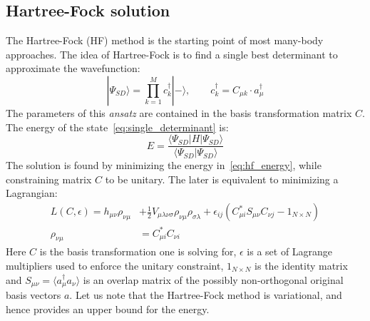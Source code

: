 \subsection{Hartree-Fock solution}
The Hartree-Fock (HF) method is the starting point of most many-body approaches.
The idea of Hartree-Fock is to find a single best determinant to 
approximate the wavefunction:
%
\begin{equation}
 |\Psi_{SD} \rangle = \prod_{k=1}^{M} c_k^{\dagger} | -\rangle, \qquad 
c_{k}^{\dagger} = C_{\mu k} \cdot a^{\dagger}_{\mu}
\label{eq:single_determinant}
\end{equation}
% 
The parameters of this \emph{ansatz} are contained in the basis transformation 
matrix $C$. The energy 
of the state~\ref{eq:single_determinant} is:
%
\begin{equation}
 E = \frac{\langle \Psi_{SD} | H | \Psi_{SD} \rangle}{\langle \Psi_{SD} | 
\Psi_{SD} \rangle}
 \label{eq:hf_energy}
\end{equation}
%
The solution is found by minimizing the energy in~\ref{eq:hf_energy}, 
while constraining matrix $C$ to be unitary. The later is equivalent to 
minimizing a Lagrangian:
%
\begin{equation}
\begin{aligned}
L(C, \epsilon) = h_{\mu \nu} \rho_{\nu \mu} &+ \frac{1}{2} 
V_{\mu \lambda \nu \sigma} \rho_{\nu \mu } \rho_{\sigma \lambda}  + 
\epsilon_{ij}(C^{\ast}_{\mu i} S_{\mu \nu} C_{\nu j} - 1_{N \times N})\\
\rho_{\nu \mu} &= C^{\ast}_{\mu i} C_{\nu i} 
\label{eq:hf_lagrangian}
\end{aligned}
\end{equation}
%
Here $C$ is the basis transformation one is solving for, $\epsilon$ is a 
set of Lagrange multipliers used to enforce the unitary constraint, $1_{N 
\times N}$ is the identity matrix and $S_{\mu \nu} = \langle a^{\dagger}_{\mu} 
a_{\nu} \rangle $ is an overlap matrix of the possibly non-orthogonal original 
basis vectors $a$. Let us note that the Hartree-Fock method 
is variational, and hence provides an upper bound for
the energy.\cite{levine2000quantum} 

